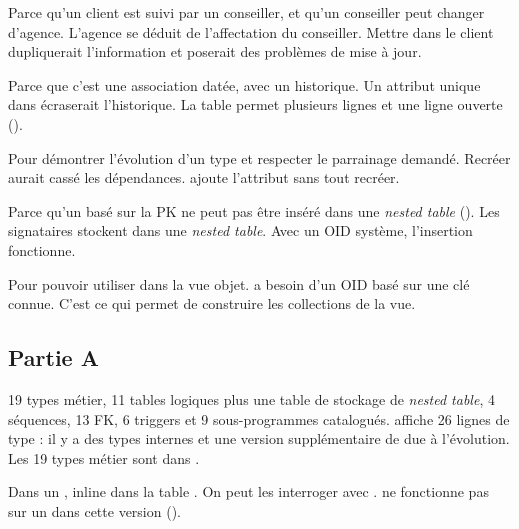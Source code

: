 {Parce qu'un client est suivi par un conseiller, et qu'un conseiller peut
changer d'agence. L'agence se déduit de l'affectation du conseiller.}
{Mettre  dans le client dupliquerait l'information et
poserait des problèmes de mise à jour.}

{Parce que c'est une association datée, avec un historique.}
{Un attribut unique dans  écraserait l'historique. La
table permet plusieurs lignes et une ligne ouverte
().}

{Pour démontrer l'évolution d'un type et respecter le parrainage demandé.}
{Recréer  aurait cassé les dépendances.
 ajoute l'attribut sans tout
recréer.}

{Parce qu'un  basé sur la PK ne peut pas être inséré dans une
\emph{nested table} ().}
{Les signataires stockent  dans une \emph{nested table}.
Avec un OID système, l'insertion fonctionne.}

{Pour pouvoir utiliser  dans la vue objet.}
{ a besoin d'un OID basé sur une clé connue. C'est ce qui
permet de construire les collections de la vue.}

\subsection{Partie A}

{19 types métier, 11 tables logiques plus une table de stockage de
\emph{nested table}, 4 séquences, 13 FK, 6 triggers et 9 sous-programmes
catalogués.}
{ affiche 26 lignes de type  : il y a des types
internes  et une version supplémentaire de
 due à l'évolution. Les 19 types métier sont dans
.}

{Dans un , inline dans la table
.}
{On peut les interroger avec .
 ne fonctionne pas sur un  dans cette version
().}


